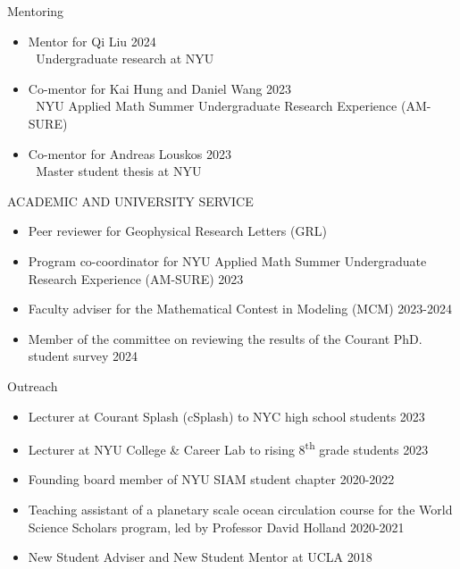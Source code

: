 \documentclass{resume} %
\begin{document}
\begin{rSection}{Mentoring}
\begin{itemize}
    \itemsep -0.3em
    \item Mentor for Qi Liu \hfill 2024\\
    $\left.\;\right.$ Undergraduate research at NYU
    \item Co-mentor for Kai Hung and Daniel Wang \hfill 2023 \\
    $\left.\;\right.$ NYU Applied Math Summer Undergraduate Research Experience (AM-SURE)
    \item Co-mentor for Andreas Louskos  \hfill 2023\\
    $\left.\;\right.$ Master student thesis at NYU
\end{itemize}
\end{rSection}


\begin{rSection}{ACADEMIC AND UNIVERSITY SERVICE}
\begin{itemize}
    \itemsep -0.3em
    \item Peer reviewer for Geophysical Research Letters (GRL)
    \item Program co-coordinator for NYU Applied Math Summer Undergraduate Research Experience (AM-SURE) \hfill 2023
    \item Faculty adviser for the Mathematical Contest in Modeling (MCM) \hfill 2023-2024
    \item Member of the committee on reviewing the results of the Courant PhD. student survey \hfill 2024
\end{itemize}
\end{rSection}

\begin{rSection}{Outreach}
\begin{itemize}
    \itemsep -0.3em
    \item Lecturer at Courant Splash (cSplash) to NYC high school students \hfill 2023
    \item Lecturer at NYU College \& Career Lab to rising 8\textsuperscript{th} grade students \hfill 2023
    \item Founding board member of NYU SIAM student chapter \hfill 2020-2022
    \item Teaching assistant of a planetary scale ocean circulation course for the World Science Scholars program, led by Professor David Holland \hfill 2020-2021
    \item New Student Adviser and New Student Mentor at UCLA \hfill 2018
\end{itemize}
\end{rSection}
\end{document}

